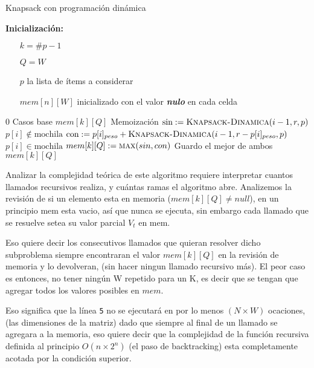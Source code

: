 \documentclass[fleqn, 11pt]{article}
\def\nulo{\textbf{\textit{nulo}}}
\begin{document}
\begin{algorithm}
\caption{Knapsack con programación dinámica}
\begin{algorithmic}[1]
\item[\textbf{Inicialización:}]
\item[] \begin{itemize}
	\item[] $k = \#p - 1$
	\item[] $Q = W$
	\item[] $p$ la lista de ítems a considerar
	\item[] $mem[n][W]$ inicializado con el valor \nulo{} en cada celda
\end{itemize}
\Statex
{}
	\State \Return $0$
\Comment Casos base
\EndIf
	\If{$mem[k][Q] \neq \nulo$}
	\State	\Return $mem[k][Q]$
	\Comment Memoización
\EndIf
\State $\text{sin} := \Call{Knapsack-Dinamica}{i - 1, r, p}$
\Comment $p[i] \not \in \text{mochila}$
	\State $\text{con} := p[i]_{peso} + \Call{Knapsack-Dinamica}{i - 1, r - p[i]_{peso}, p}$
\Comment $p[i] \in \text{mochila}$
\State $mem[k][Q] := \Call{max}{sin, con}$
\Comment Guardo el mejor de ambos
\State \Return $mem[k][Q]$
\EndFunction
\end{algorithmic}
\end{algorithm}

Analizar la complejidad teórica de este algoritmo requiere interpretar cuantos
llamados recursivos realiza, y cuántas ramas el algoritmo abre. Analizemos la
revisión de si un elemento esta en memoria ($mem[k][Q] \neq null$), en un
principio mem esta vacio,  así que nunca se ejecuta, sin embargo cada llamado
que se resuelve setea su valor parcial \textit{$V_t$} en mem.

Eso quiere decir los consecutivos llamados que quieran resolver dicho
subproblema siempre encontraran el valor $mem[k][Q]$ en la revisión de memoria
y lo devolveran, (sin hacer ningun llamado recursivo más). El peor caso es
entonces, no tener ningún W repetido para un K, es decir que se tengan que
agregar todos los valores posibles en $mem$.

Eso significa que la línea \texttt{5} no se ejecutará en por lo menos $(N
\times W)$ ocaciones, (las dimensiones de la matriz) dado que siempre al final
de un llamado se agregara a la memoria, eso quiere decir que la complejidad de
la función recursiva definida al principio $O(n \times 2^n)$ (el paso de
backtracking) esta completamente acotada por la condición superior.
\end{document}
